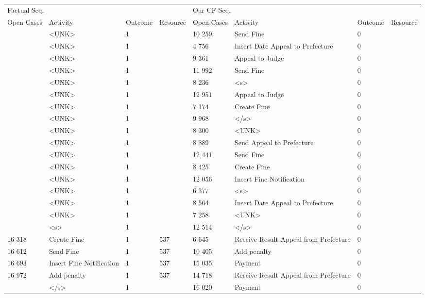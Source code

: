 \begin{tabular}{llllllll}
\toprule
\multicolumn{4}{l}{Factual Seq.} & \multicolumn{4}{l}{Our CF Seq.} \\
Open Cases & Activity & Outcome & Resource & Open Cases & Activity & Outcome & Resource \\
\midrule
 & <UNK> & 1 &  & 10 259 & Send Fine & 0 &  \\
 & <UNK> & 1 &  & 4 756 & Insert Date Appeal to Prefecture & 0 &  \\
 & <UNK> & 1 &  & 9 361 & Appeal to Judge & 0 &  \\
 & <UNK> & 1 &  & 11 992 & Send Fine & 0 &  \\
 & <UNK> & 1 &  & 8 236 & <s> & 0 &  \\
 & <UNK> & 1 &  & 12 951 & Appeal to Judge & 0 &  \\
 & <UNK> & 1 &  & 7 174 & Create Fine & 0 &  \\
 & <UNK> & 1 &  & 9 968 & </s> & 0 &  \\
 & <UNK> & 1 &  & 8 300 & <UNK> & 0 &  \\
 & <UNK> & 1 &  & 8 889 & Send Appeal to Prefecture & 0 &  \\
 & <UNK> & 1 &  & 12 441 & Send Fine & 0 &  \\
 & <UNK> & 1 &  & 8 425 & Create Fine & 0 &  \\
 & <UNK> & 1 &  & 12 056 & Insert Fine Notification & 0 &  \\
 & <UNK> & 1 &  & 6 377 & <s> & 0 &  \\
 & <UNK> & 1 &  & 8 564 & Insert Date Appeal to Prefecture & 0 &  \\
 & <UNK> & 1 &  & 7 258 & <UNK> & 0 &  \\
 & <s> & 1 &  & 12 514 & </s> & 0 &  \\
16 318 & Create Fine & 1 & 537 & 6 645 & Receive Result Appeal from Prefecture & 0 &  \\
16 612 & Send Fine & 1 & 537 & 10 405 & Add penalty & 0 &  \\
16 693 & Insert Fine Notification & 1 & 537 & 15 035 & Payment & 0 &  \\
16 972 & Add penalty & 1 & 537 & 14 718 & Receive Result Appeal from Prefecture & 0 &  \\
 & </s> & 1 &  & 16 020 & Payment & 0 &  \\
\bottomrule
\end{tabular}
